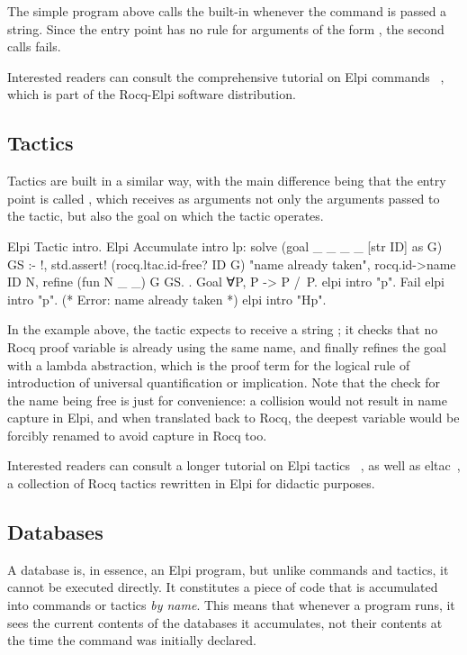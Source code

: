 \documentclass[a4paper, 11pt]{book}
\begin{document}
The simple program above calls the  built-in whenever the
command is passed a string. Since the entry point  has no rule for
arguments of the form , the second calls fails.

Interested readers can consult the comprehensive tutorial on Elpi commands
~\cite{tuto:commands}, which is part of the Rocq-Elpi software distribution.

\subsection{Tactics}


Tactics are built in a similar way, with the main difference being that the
entry point is called , which receives as arguments not only the
arguments passed to the tactic, but also the goal on which the tactic
operates.

\begin{rocqcode}
Elpi Tactic intro.
Elpi Accumulate intro lp:{{
  solve (goal _ _ _ _ [str ID] as G) GS :- !,
    std.assert! (rocq.ltac.id-free? ID G) "name already taken",
    rocq.id->name ID N,
    refine (fun N _ _) G GS.
}}.
Goal ∀P, P -> P /\ P.
elpi intro "p".
Fail elpi intro "p". (* Error: name already taken *)
elpi intro "Hp".
\end{rocqcode}


In the example above, the tactic expects to receive a string ; it
checks that no Rocq proof variable is already using the same name, and finally
refines the goal with a lambda abstraction, which is the proof term for the
logical rule of introduction of universal quantification or implication.
Note that the check for the name being free is just for convenience: a
collision would not result in name capture in Elpi, and when translated back
to Rocq, the deepest variable would be forcibly renamed to avoid capture in Rocq too.

Interested readers can consult a longer tutorial on Elpi tactics
~\cite{tuto:tactics}, as well as eltac~\cite{app:eltac}, a collection of Rocq
tactics rewritten in Elpi for didactic purposes.

\subsection{Databases}\label{sec:homo}


A database is, in essence, an Elpi program, but unlike commands and tactics,
it cannot be executed directly. It constitutes a piece of code that is
accumulated into commands or tactics \emph{by name}. This means that whenever
a program runs, it sees the current contents of the databases it accumulates,
not their contents at the time the command was initially declared.
\end{document}
